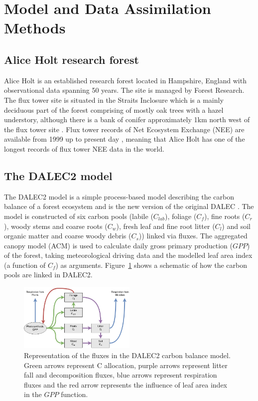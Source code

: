 \documentclass[11pt]{article}
\begin{document}
\section{Model and Data Assimilation Methods}

\subsection{Alice Holt research forest}

Alice Holt is an established research forest located in Hampshire, England with observational data spanning 50 years. The site is managed by Forest Research. The flux tower site is situated in the Straits Inclosure which is a mainly deciduous part of the forest comprising of mostly oak trees with a hazel understory, although there is a bank of conifer approximately 1km north west of the flux tower site \citep{pitman2001leaf}. Flux tower records of Net Ecosystem Exchange (NEE) are available from 1999 up to present day \citep{wilkinson2012inter}, meaning that Alice Holt has one of the longest records of flux tower NEE data in the world. 

\subsection{The DALEC2 model}

The DALEC2 model is a simple process-based model describing the carbon balance of a forest ecosystem \citep{Bloom2015} and is the new version of the original DALEC \citep{williams2005improved}. The model is constructed of six carbon pools (labile ($C_{lab}$), foliage ($C_f$), fine roots ($C_r$), woody stems and coarse roots ($C_w$), fresh leaf and fine root litter ($C_l$) and soil organic matter and coarse woody debris ($C_s$)) linked via fluxes. The aggregated canopy model (ACM) \citep{williams1997predicting} is used to calculate daily gross primary production ($GPP$) of the forest, taking meteorological driving data and the modelled leaf area index (a function of $C_f$) as arguments. Figure~\ref{fig:DALEC_mod} shows a schematic of how the carbon pools are linked in DALEC2.   

\begin{figure}[ht]
    \centering
    \includegraphics[width=0.5\textwidth]{Dalecdiagram.png}
    \caption{Representation of the fluxes in the DALEC2 carbon balance model. Green arrows represent C allocation, purple arrows represent litter fall and decomposition fluxes, blue arrows represent respiration fluxes and the red arrow represents the influence of leaf area index in the $GPP$ function.}
    \label{fig:DALEC_mod}
\end{figure}
\end{document}
